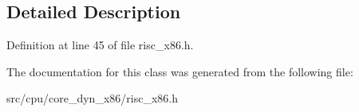 \subsection{Detailed Description}


Definition at line 45 of file risc\-\_\-x86.\-h.



The documentation for this class was generated from the following file\-:\begin{DoxyCompactItemize}
\item 
src/cpu/core\-\_\-dyn\-\_\-x86/risc\-\_\-x86.\-h\end{DoxyCompactItemize}
